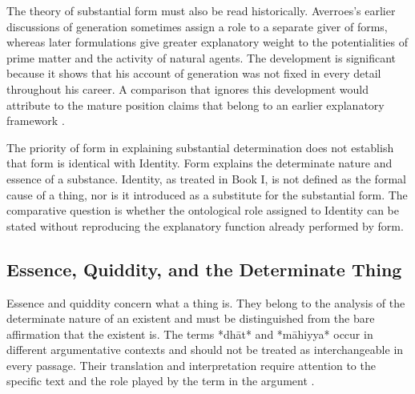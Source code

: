 \label{para:VS.B01.P01.C08.S15.SS06.P003}

The theory of substantial form must also be read historically.
Averroes's earlier discussions of generation sometimes
assign a role to a separate giver of forms, whereas later
formulations give greater explanatory weight to the
potentialities of prime matter and the activity of natural
agents. The development is significant because it shows
that his account of generation was not fixed in every
detail throughout his career. A comparison that ignores
this development would attribute to the mature position
claims that belong to an earlier explanatory framework
\citep{BenAhmedPasnauIbnRushdSEP2025}.

\label{para:VS.B01.P01.C08.S15.SS06.P004}

The priority of form in explaining substantial determination
does not establish that form is identical with Identity.
Form explains the determinate nature and essence of a
substance. Identity, as treated in Book I, is not defined
as the formal cause of a thing, nor is it introduced as
a substitute for the substantial form. The comparative
question is whether the ontological role assigned to
Identity can be stated without reproducing the explanatory
function already performed by form.



\subsection{Essence, Quiddity, and the Determinate Thing}
\label{subsec:ch08_s15_ss07}

\label{para:VS.B01.P01.C08.S15.SS07.P001}

Essence and quiddity concern what a thing is. They belong
to the analysis of the determinate nature of an existent
and must be distinguished from the bare affirmation that
the existent is. The terms *dhāt* and *māhiyya* occur in
different argumentative contexts and should not be treated
as interchangeable in every passage. Their translation
and interpretation require attention to the specific
text and the role played by the term in the argument
\citep{AverroesEpitomeMetaphysicsArnzen2010,
AverroesLongCommentaryMetaphysicsBouyges1990}.

